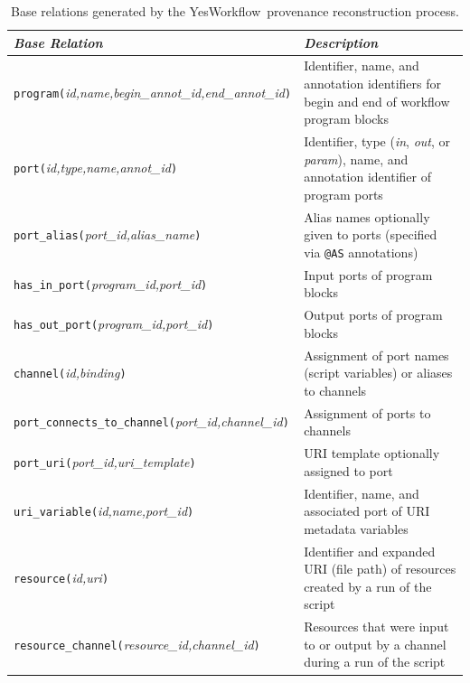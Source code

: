 \documentclass[nocopyrightspace]{sigplanconf}
\newcommand{\YW}{\textsf{YesWorkflow}}
\begin{document}
\begin{table}[thb]
\begin{tabular}{|l|l|} \hline
\textbf{\em Base Relation} & \textbf{\em Description} \\ \hline\hline

{\tt program(}{\em id,name,begin\_annot\_id,end\_annot\_id}{\tt )} & 
Identifier, name, and annotation identifiers for begin and end of workflow 
program blocks
\\ \hline

{\tt port(}{\em id,type,name,annot\_id}{\tt )} & 
Identifier, type (\emph{in}, \emph{out}, or \emph{param}), name, and annotation identifier
of program ports
\\ \hline

{\tt port\_alias(}{\em port\_id,alias\_name}{\tt )} &
Alias names optionally given to ports (specified via {\tt @AS} annotations) 
\\ \hline

{\tt has\_in\_port(}{\em program\_id,port\_id}{\tt )} &
Input ports of program blocks 
\\ \hline

{\tt has\_out\_port(}{\em program\_id,port\_id}{\tt )} &
Output ports of program blocks 
\\ \hline

{\tt channel(}{\em id,binding}{\tt )} & 
Assignment of port names (script variables) or aliases to channels
\\ \hline

{\tt port\_connects\_to\_channel(}{\em port\_id,channel\_id}{\tt)} & 
Assignment of ports to channels 
\\ \hline

{\tt port\_uri(}{\em port\_id,uri\_template}{\tt)} & 
URI template optionally assigned to port
\\ \hline

{\tt uri\_variable(}{\em id,name,port\_id}{\tt )} & 
Identifier, name, and associated port of URI metadata variables 
\\ \hline

{\tt resource(}{\em id,uri}{\tt )} & 
Identifier and expanded URI (file path) of resources created by a run of the script 
\\ \hline

{\tt resource\_channel(}{\em resource\_id,channel\_id}{\tt )} & 
Resources that were input to or output by a channel
during a run of the script
\\ \hline  
\end{tabular}
\nocaptionrule
\caption{Base relations generated by the \YW\ provenance 
  reconstruction process.}
\label{tbl:baserels}
\end{table}
\end{document}
